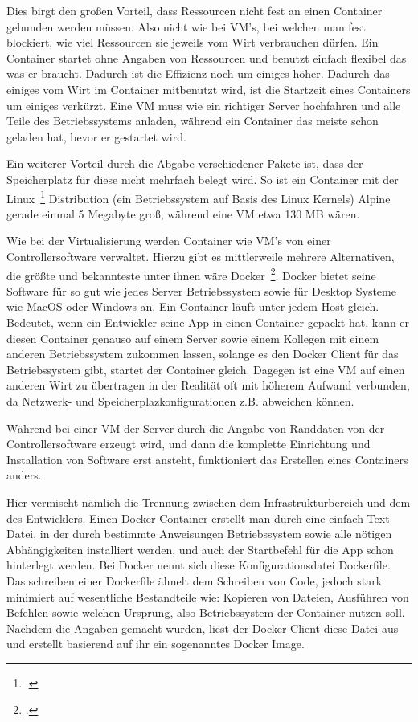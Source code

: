Dies birgt den großen Vorteil, dass Ressourcen nicht fest an einen Container gebunden werden müssen. Also nicht wie bei VM's, bei welchen man fest blockiert, wie viel Ressourcen sie jeweils vom Wirt verbrauchen dürfen.
Ein Container startet ohne Angaben von Ressourcen und benutzt einfach flexibel das was er braucht. Dadurch ist die Effizienz noch um einiges höher.
Dadurch das einiges vom Wirt im Container mitbenutzt wird, ist die Startzeit eines Containers um einiges verkürzt. 
Eine VM muss wie ein richtiger Server hochfahren und alle Teile des Betriebssystems anladen, während ein Container das meiste schon geladen hat, bevor er gestartet wird.

Ein weiterer Vorteil durch die Abgabe verschiedener Pakete ist, dass der Speicherplatz für diese nicht mehrfach belegt wird. So ist ein Container mit der
Linux~\footcite[Vgl. ][]{website:linux} Distribution (ein Betriebssystem auf Basis des Linux Kernels) Alpine gerade einmal 5 Megabyte groß, während eine VM etwa 130 MB wären.

Wie bei der Virtualisierung werden Container wie VM's von einer Controllersoftware verwaltet. Hierzu gibt es mittlerweile mehrere Alternativen, die größte und bekannteste unter ihnen wäre Docker~\footcite[Vgl. ][]{website:docker}.
Docker bietet seine Software für so gut wie jedes Server Betriebssystem sowie für Desktop Systeme wie MacOS oder Windows an. Ein Container läuft unter jedem Host gleich.
Bedeutet, wenn ein Entwickler seine App in einen Container gepackt hat, kann er diesen Container genauso auf einem Server sowie einem Kollegen mit einem anderen Betriebssystem zukommen lassen, 
solange es den Docker Client für das Betriebssystem gibt, startet der Container gleich.
Dagegen ist eine VM auf einen anderen Wirt zu übertragen in der Realität oft mit höherem Aufwand verbunden, da Netzwerk- und Speicherplazkonfigurationen z.B. abweichen können.

Während bei einer VM der Server durch die Angabe von Randdaten von der Controllersoftware erzeugt wird, und dann die komplette Einrichtung und Installation von Software erst ansteht, 
funktioniert das Erstellen eines Containers anders.

Hier vermischt nämlich die Trennung zwischen dem Infrastrukturbereich und dem des Entwicklers. Einen Docker Container erstellt man durch eine einfach Text Datei, in der durch 
bestimmte Anweisungen Betriebssystem sowie alle nötigen Abhängigkeiten installiert werden, und auch der Startbefehl für die App schon hinterlegt werden. 
Bei Docker nennt sich diese Konfigurationsdatei Dockerfile. Das schreiben einer Dockerfile ähnelt dem Schreiben von Code, jedoch stark minimiert auf 
wesentliche Bestandteile wie: Kopieren von Dateien, Ausführen von Befehlen sowie welchen Ursprung, also Betriebssystem der Container nutzen soll.
Nachdem die Angaben gemacht wurden, liest der Docker Client diese Datei aus und erstellt basierend auf ihr ein sogenanntes Docker Image.

